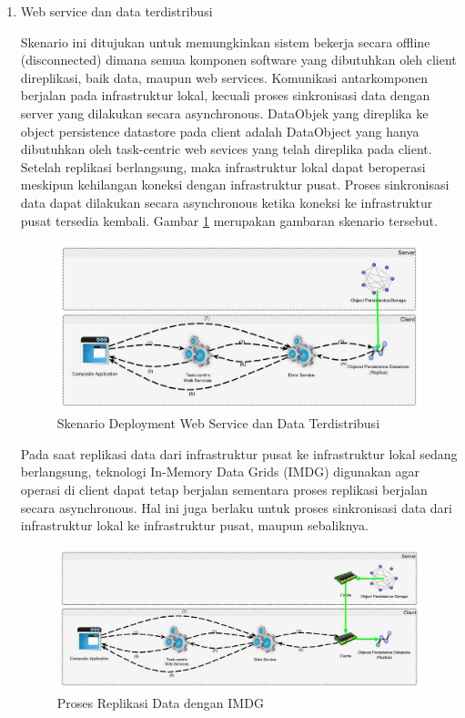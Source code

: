 \begin{enumerate}
\item Web service dan data terdistribusi

Skenario ini ditujukan untuk memungkinkan sistem bekerja secara offline (disconnected) dimana semua komponen software yang dibutuhkan oleh client direplikasi, baik data, maupun web services. Komunikasi antarkomponen berjalan pada infrastruktur lokal, kecuali proses sinkronisasi data dengan server yang dilakukan secara asynchronous. DataObjek yang direplika ke object persistence datastore pada client adalah DataObject yang hanya dibutuhkan oleh task-centric web sevices yang telah direplika pada client. Setelah replikasi berlangsung, maka infrastruktur lokal dapat beroperasi meskipun kehilangan koneksi dengan infrastruktur pusat. Proses sinkronisasi data dapat dilakukan secara asynchronous ketika koneksi ke infrastruktur pusat tersedia kembali. Gambar \ref{fig:deployment-3a} merupakan gambaran skenario tersebut.

\begin{figure}[h]
    \centering
    \includegraphics[width=13cm]{../../Resources/Images/takdir-deployment-3a}
    \caption{Skenario Deployment Web Service dan Data Terdistribusi}
    \label{fig:deployment-3a}
\end{figure}

Pada saat replikasi data dari infrastruktur pusat ke infrastruktur lokal sedang berlangsung, teknologi In-Memory Data Grids (IMDG) digunakan agar operasi di client dapat tetap berjalan sementara proses replikasi berjalan secara asynchronous. Hal ini juga berlaku untuk proses sinkronisasi data dari infrastruktur lokal ke infrastruktur pusat, maupun sebaliknya.

\begin{figure}[h]
    \centering
    \includegraphics[width=13cm]{../../Resources/Images/takdir-deployment-3b}
    \caption{Proses Replikasi Data dengan IMDG}
    \label{fig:deployment-3b}
\end{figure}
\end{enumerate}

